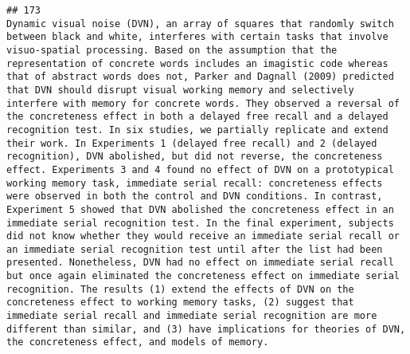 \documentclass[
  english,
  man]{apa6}
\begin{document}
\begin{verbatim}
## 173                                                                                                                                                                                                                                                                                                                                                                                                                                                                                                                                                                                                                                                                                                                                                                                                                                                                                                                                               Dynamic visual noise (DVN), an array of squares that randomly switch between black and white, interferes with certain tasks that involve visuo-spatial processing. Based on the assumption that the representation of concrete words includes an imagistic code whereas that of abstract words does not, Parker and Dagnall (2009) predicted that DVN should disrupt visual working memory and selectively interfere with memory for concrete words. They observed a reversal of the concreteness effect in both a delayed free recall and a delayed recognition test. In six studies, we partially replicate and extend their work. In Experiments 1 (delayed free recall) and 2 (delayed recognition), DVN abolished, but did not reverse, the concreteness effect. Experiments 3 and 4 found no effect of DVN on a prototypical working memory task, immediate serial recall: concreteness effects were observed in both the control and DVN conditions. In contrast, Experiment 5 showed that DVN abolished the concreteness effect in an immediate serial recognition test. In the final experiment, subjects did not know whether they would receive an immediate serial recall or an immediate serial recognition test until after the list had been presented. Nonetheless, DVN had no effect on immediate serial recall but once again eliminated the concreteness effect on immediate serial recognition. The results (1) extend the effects of DVN on the concreteness effect to working memory tasks, (2) suggest that immediate serial recall and immediate serial recognition are more different than similar, and (3) have implications for theories of DVN, the concreteness effect, and models of memory.

\end{verbatim}
\end{document}
